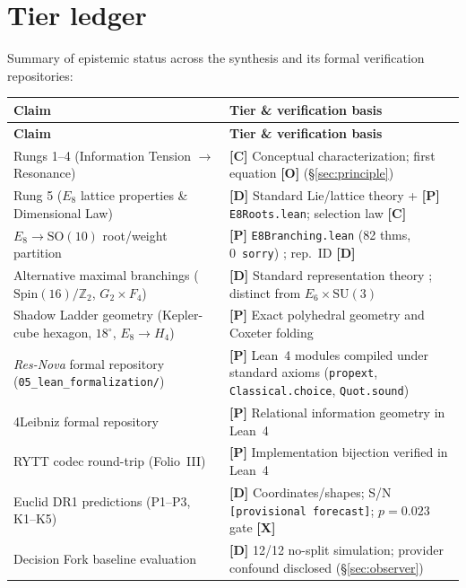\documentclass[11pt]{article}
\begin{document}
\section{Tier ledger}
\label{app:tiers}
Summary of epistemic status across the synthesis and its formal verification repositories:
\begin{longtable}{p{}p{}}
\hline
\textbf{Claim} & \textbf{Tier \& verification basis} \\
\hline
\endfirsthead
\hline
\textbf{Claim} & \textbf{Tier \& verification basis} \\
\hline
\endhead
\hline
\endfoot
Rungs 1--4 (Information Tension $\to$ Resonance) & \textbf{[C]} Conceptual characterization; first equation \textbf{[O]} (\S\ref{sec:principle}) \\
Rung 5 ($E_8$ lattice properties \& Dimensional Law) & \textbf{[D]} Standard Lie/lattice theory + \textbf{[P]} \texttt{E8Roots.lean}; selection law \textbf{[C]} \\
$E_8 \to \mathrm{SO}(10)$ root/weight partition & \textbf{[P]} \texttt{E8Branching.lean} (82 thms, 0~\texttt{sorry}) \cite{res-nova-repo}; rep.\ ID \textbf{[D]} \cite{slansky,adler} \\
Alternative maximal branchings ($\mathrm{Spin}(16)/\mathbb{Z}_2$, $G_2 \times F_4$) & \textbf{[D]} Standard representation theory \cite{slansky}; distinct from $E_6 \times \mathrm{SU}(3)$ \\
Shadow Ladder geometry (Kepler-cube hexagon, $18^\circ$, $E_8 \to H_4$) & \textbf{[P]} Exact polyhedral geometry and Coxeter folding \cite{predictions-paper,moody-patera} \\
\emph{Res-Nova} formal repository (\texttt{05\_lean\_formalization/}) & \textbf{[P]} Lean~4 modules compiled under standard axioms (\texttt{propext}, \texttt{Classical.choice}, \texttt{Quot.sound}) \cite{res-nova-repo} \\
4Leibniz formal repository & \textbf{[P]} Relational information geometry in Lean~4 \cite{four-leibniz} \\
RYTT codec round-trip (Folio~III) & \textbf{[P]} Implementation bijection verified in Lean~4 \cite{folio-iii} \\
Euclid DR1 predictions (P1--P3, K1--K5) & \textbf{[D]} Coordinates/shapes; S/N \texttt{[provisional forecast]}; $p=0.023$ gate \textbf{[X]} \cite{predictions-paper} \\
Decision Fork baseline evaluation & \textbf{[D]} 12/12 no-split simulation; provider confound disclosed (\S\ref{sec:observer}) \\
\hline
\end{longtable}
\end{document}
